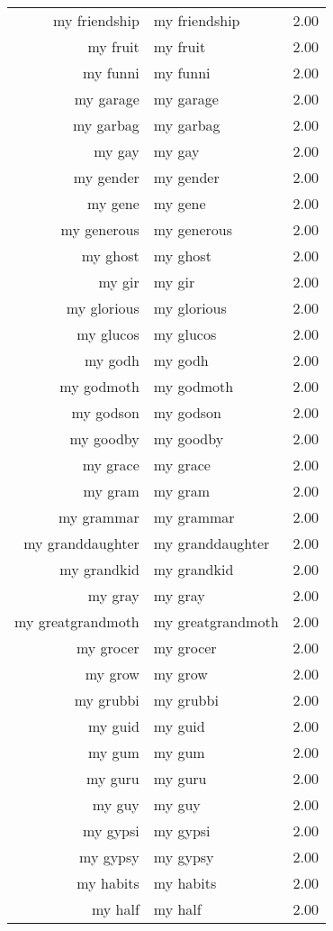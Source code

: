 \begin{table}[ht]
\begin{tabular}{rlr}
  my friendship & my friendship & 2.00 \\ 
  my fruit & my fruit & 2.00 \\ 
  my funni & my funni & 2.00 \\ 
  my garage & my garage & 2.00 \\ 
  my garbag & my garbag & 2.00 \\ 
  my gay & my gay & 2.00 \\ 
  my gender & my gender & 2.00 \\ 
  my gene & my gene & 2.00 \\ 
  my generous & my generous & 2.00 \\ 
  my ghost & my ghost & 2.00 \\ 
  my gir & my gir & 2.00 \\ 
  my glorious & my glorious & 2.00 \\ 
  my glucos & my glucos & 2.00 \\ 
  my godh & my godh & 2.00 \\ 
  my godmoth & my godmoth & 2.00 \\ 
  my godson & my godson & 2.00 \\ 
  my goodby & my goodby & 2.00 \\ 
  my grace & my grace & 2.00 \\ 
  my gram & my gram & 2.00 \\ 
  my grammar & my grammar & 2.00 \\ 
  my granddaughter & my granddaughter & 2.00 \\ 
  my grandkid & my grandkid & 2.00 \\ 
  my gray & my gray & 2.00 \\ 
  my greatgrandmoth & my greatgrandmoth & 2.00 \\ 
  my grocer & my grocer & 2.00 \\ 
  my grow & my grow & 2.00 \\ 
  my grubbi & my grubbi & 2.00 \\ 
  my guid & my guid & 2.00 \\ 
  my gum & my gum & 2.00 \\ 
  my guru & my guru & 2.00 \\ 
  my guy & my guy & 2.00 \\ 
  my gypsi & my gypsi & 2.00 \\ 
  my gypsy & my gypsy & 2.00 \\ 
  my habits & my habits & 2.00 \\ 
  my half & my half & 2.00 \\ 

\end{tabular}
\end{table}
